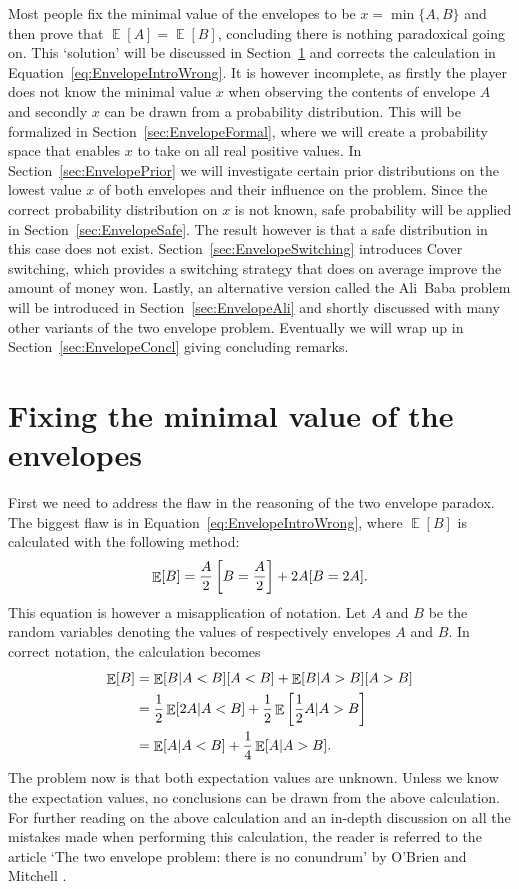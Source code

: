 \documentclass[a4paper]{report}
\theoremstyle{plain}
\theoremstyle{definition}
\theoremstyle{remark}
\numberwithin{equation}{chapter}
\let\P\relax
\DeclareMathOperator{\P}{\mathbb{P}}
\DeclareMathOperator{\E}{\mathbb{E}}
\DeclareMathOperator{\1}{\mathbbm{1}}
\begin{document}
Most people fix the minimal value of the envelopes to be $x=\min\{A,B\}$ and then prove that $\E[A]=\E[B]$, concluding there is nothing paradoxical going on. This `solution' will be discussed in Section~\ref{sec:EnvelopeNaive} and corrects the calculation in Equation~\ref{eq:EnvelopeIntroWrong}. It is however incomplete, as firstly the player does not know the minimal value $x$ when observing the contents of envelope $A$ and secondly $x$ can be drawn from a probability distribution. This will be formalized in Section~\ref{sec:EnvelopeFormal}, where we will create a probability space that enables $x$ to take on all real positive values. In Section~\ref{sec:EnvelopePrior} we will investigate certain prior distributions on the lowest value $x$ of both envelopes and their influence on the problem. Since the correct probability distribution on $x$ is not known, safe probability will be applied in Section~\ref{sec:EnvelopeSafe}. The result however is that a safe distribution in this case does not exist. Section~\ref{sec:EnvelopeSwitching} introduces Cover switching, which provides a switching strategy that does on average improve the amount of money won. Lastly, an alternative version called the Ali~Baba problem will be introduced in Section~\ref{sec:EnvelopeAli} and shortly discussed with many other variants of the two envelope problem. Eventually we will wrap up in Section~\ref{sec:EnvelopeConcl} giving concluding remarks.

\section{Fixing the minimal value of the envelopes}\label{sec:EnvelopeNaive}
First we need to address the flaw in the reasoning of the two envelope paradox. The biggest flaw is in Equation~\ref{eq:EnvelopeIntroWrong}, where $\E[B]$ is calculated with the following method:
\begin{equation}
\E[B]=\frac{A}{2}\P\left[B=\frac{A}{2}\right]+2A\P[B=2A].
\end{equation}
This equation is however a misapplication of notation. Let $A$ and $B$ be the random variables denoting the values of respectively envelopes $A$ and $B$.  In correct notation, the calculation becomes
\begin{align}\label{eq:EnvelopeIntroCorrect}
\E[B]&=\E[B|A<B]\P[A<B]+\E[B|A>B]\P[A>B]\\
&=\frac{1}{2}\E[2A|A<B]+\frac{1}{2}\E\left[\frac{1}{2}A|A>B\right]\\
&=\E[A|A<B]+\frac{1}{4}\E[A|A>B].
\end{align}
The problem now is that both expectation values are unknown. Unless we know the expectation values, no conclusions can be drawn from the above calculation. For further reading on the above calculation and an in-depth discussion on all the mistakes made when performing this calculation, the reader is referred to the article `The two envelope problem: there is no conundrum' by O'Brien and Mitchell \cite{Brien14}. 
\end{document}
